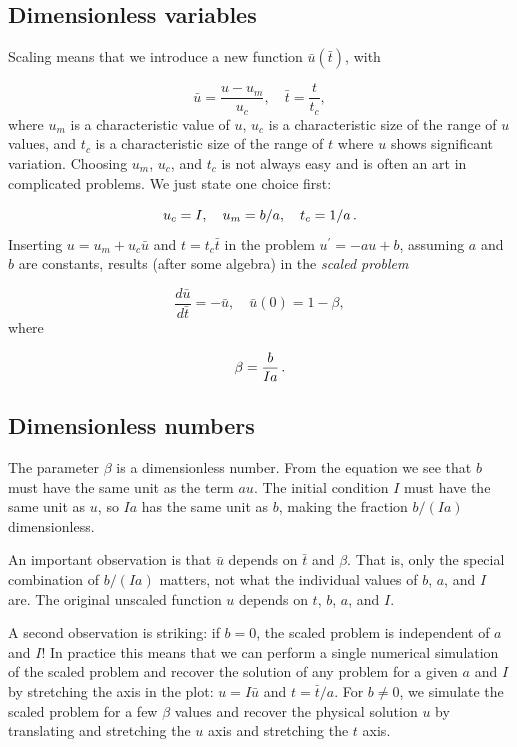 \documentclass[%
oneside,                 %
final,                   %
10pt]{article}
\begin{document}
\subsection{Dimensionless variables}

Scaling means that we introduce a new function $\bar u(\bar t)$,
with

\[ \bar u = \frac{u - u_m}{u_c},\quad \bar t = \frac{t}{t_c},\]
where $u_m$ is a characteristic value of $u$, $u_c$ is a characteristic
size of the range of $u$ values, and $t_c$ is a characteristic
size of the range of $t$ where $u$ shows significant variation.
Choosing $u_m$, $u_c$, and $t_c$ is not always easy and is often an art
in complicated problems. We just state one choice first:

\[ u_c = I,\quad u_m = b/a,\quad t_c = 1/a\tp\]
Inserting $u=u_m + u_c\bar u$ and $t=t_c\bar t$ in the problem
$u^{\prime}=-au + b$, assuming $a$ and $b$ are constants, results (after some
algebra) in the \emph{scaled problem}

\[ \frac{d\bar u}{d\bar t} = -\bar u,\quad \bar u(0)=1 - \beta,\]
where

\[ \beta = \frac{b}{Ia}\tp\]

\subsection{Dimensionless numbers}

The parameter $\beta$ is a dimensionless number. From the equation we
see that $b$ must have the same unit as the term $au$. The initial
condition $I$ must have the same unit as $u$, so $Ia$ has the same
unit as $b$, making the fraction $b/(Ia)$ dimensionless.

An important observation is that $\bar u$ depends on $\bar t$
and $\beta$.
That is, only the special combination of $b/(Ia)$ matters, not what
the individual values of $b$, $a$, and $I$ are. The original unscaled
function $u$ depends on $t$, $b$, $a$, and $I$.

A second observation is striking: if $b=0$, the scaled problem is
independent of $a$ and $I$! In practice this means that we can perform
a single numerical simulation of the scaled problem and recover the
solution of any problem for a given $a$ and $I$ by stretching the axis
in the plot: $u=I\bar u$ and $t =\bar t/a$.  For $b\neq 0$, we
simulate the scaled problem for a few $\beta$ values and recover the
physical solution $u$ by translating and stretching the $u$ axis and
stretching the $t$ axis.
\end{document}
